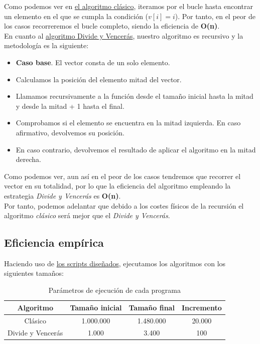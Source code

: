 \documentclass[12pt,spanish]{article}
\begin{document}
Como podemos ver en \textcolor{blue!60}{\hyperref[alg:clasico]{el algoritmo clásico}}, iteramos por el bucle hasta encontrar un elemento en el que se cumpla la condición ($v[i]=i$). Por tanto, en el peor de los casos recorreremos el bucle completo, siendo la eficiencia de \textbf{O(n)}.\\

En cuanto al \textcolor{blue!60}{\hyperref[alg:clasico]{algoritmo Divide y Vencerás}}, nuestro algoritmo es recursivo y la metodología es la siguiente:
\begin{itemize}
	\item \textbf{Caso base}. El vector consta de un solo elemento.
	\item Calculamos la posición del elemento mitad del vector.
	\item Llamamos recursivamente a la función desde el tamaño inicial hasta la mitad y desde la mitad + 1 hasta el final.
	\item Comprobamos si el elemento se encuentra en la mitad izquierda. En caso afirmativo, devolvemos \textcolor{blue!90}{su posición}.
	\item En caso contrario, devolvemos \textcolor{blue!90}{el resultado de aplicar el algoritmo en la mitad derecha}.
\end{itemize}

Como podemos ver, aun así en el peor de los casos tendremos que recorrer el vector en su totalidad, por lo que la eficiencia del algoritmo empleando la estrategia \textit{Divide y Vencerás} es \textbf{O(n)}.\\

Por tanto, podemos adelantar que debido a los costes físicos de la recursión el algoritmo \emph{clásico} será mejor que el \emph{Divide y Vencerás}.

\subsection{Eficiencia empírica}

Haciendo uso de \textcolor{blue!60}{\hyperref[sec:scripts]{los scripts diseñados}}, ejecutamos los algoritmos con los siguientes tamaños:

\begin{table}[H]
\centering
\begin{tabular}{|c|c|c|c|}
\hline
\textbf{Algoritmo}  & \textbf{Tamaño inicial} & \textbf{Tamaño final} & \textbf{Incremento}\\
\hline
Clásico & 1.000.000 & 1.480.000 & 20.000 \\
Divide y Vencerás & 1.000 & 3.400 & 100\\
\hline
\end{tabular}
\caption{Parámetros de ejecución de cada programa}
\end{table}
\end{document}
